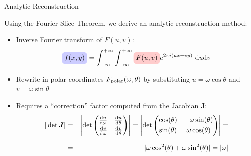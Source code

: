 \begin{frame}[c]{Analytic Reconstruction}

	Using the Fourier Slice Theorem, we derive an analytic reconstruction method:

	\hspace{0.8cm}
	\begin{itemize}
		\setlength\itemsep{0.8cm}
		\item<2-> Inverse Fourier transform of $F(u,v)$:
		      \begin{equation}
			      \tikz[baseline]{\node[fill=blue!20,anchor=base, rounded corners] (f1) {$f(x,y)$};}
			      = \int_{-\infty}^{+\infty}\int_{-\infty}^{+\infty}
			      \tikz[baseline]{\node[fill=red!20,anchor=base, rounded corners] (F1) {$F(u,v)$};}
			      e^{2\pi i(ux+vy)} \ \textnormal du \textnormal dv
		      \end{equation}

		\item<5-> Rewrite in polar coordinates $F_{\textnormal{polar}}(\omega, \theta)$ by substituting $u = \omega \cos \theta$ and $v = \omega \sin \theta$

		\item<6-> Requires a ``correction'' factor computed from the Jacobian $\boldsymbol J$:
		      \begin{eqnarray}
			      |\det\boldsymbol J| &=&
			      \left|\det\begin{pmatrix}
				      \frac{\textnormal du}{\textnormal d\omega} & \frac{\textnormal du}{\textnormal d\theta}  \\[0.3em]
				      \frac{\textnormal dv}{\textnormal d\omega} & \frac{\textnormal dv}{\textnormal d \theta}
			      \end{pmatrix}\right| =
			      \left|\det\begin{pmatrix}
				      \cos(\theta) & -\omega \sin(\theta) \\[0.3em]
				      \sin(\theta) & \omega \cos(\theta)
			      \end{pmatrix}\right| =\\[0.75em]
			      &=&|\omega \cos^2(\theta) + \omega \sin^2(\theta)| = |\omega|
		      \end{eqnarray}



\end{itemize}
\end{frame}
